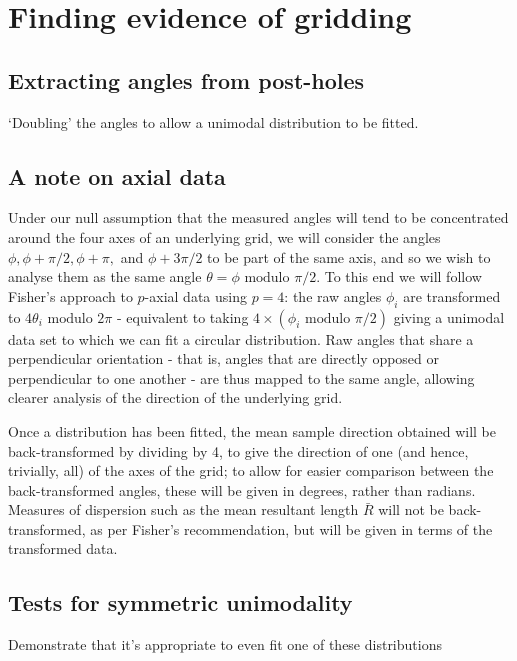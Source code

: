 \documentclass[../../ArchStats.tex]{subfiles}
\begin{document}
\section{Finding evidence of gridding}


\subsection{Extracting angles from post-holes}
`Doubling' the angles to allow a unimodal distribution to be fitted.

\subsection{A note on axial data}
Under our null assumption that the measured angles will tend to be concentrated around the four axes of an underlying grid, we will consider the angles $\phi, \phi + \pi/2, \phi + \pi,$ and $\phi + 3\pi/2$ to be part of the same axis, and so we wish to analyse them as the same angle $\theta = \phi \text{ modulo }\pi/2$.
To this end we will follow Fisher's approach to $p$-axial data \cite{Fisher1993} using $p=4$: the raw angles $\phi_i$ are transformed to $4\theta_i \text{ modulo } 2\pi$ - equivalent to taking $4 \times (\phi_i \text{ modulo }\pi/2)$ giving a unimodal data set to which we can fit a circular distribution. Raw angles that share a perpendicular orientation - that is, angles that are directly opposed or perpendicular to one another - are thus mapped to the same angle, allowing clearer analysis of the direction of the underlying grid.

Once a distribution has been fitted, the mean sample direction obtained will be back-transformed by dividing by 4, to give the direction of one (and hence, trivially, all) of the axes of the grid; to allow for easier comparison between the back-transformed angles, these will be given in degrees, rather than radians. Measures of dispersion such as the mean resultant length $\bar{R}$ will not be back-transformed, as per Fisher's recommendation, but will be given in terms of the transformed data.

\subsection{Tests for symmetric unimodality}
Demonstrate that it's appropriate to even fit one of these distributions
\end{document}
